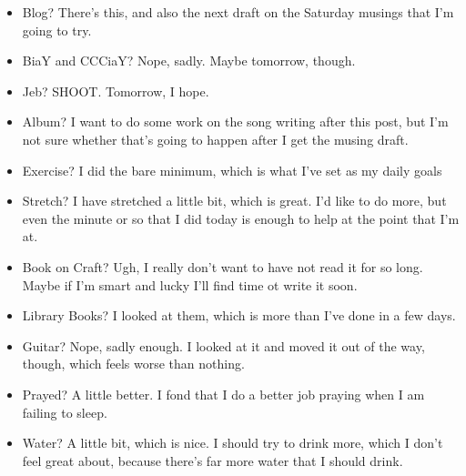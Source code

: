 \documentclass[12pt]{article}[titlepage]
\renewcommand{\,}{\textsuperscript{,}}
\begin{document}
\begin{itemize}
\item Blog? There's this, and also the next draft on the Saturday musings that I'm going to try.
\item BiaY and CCCiaY? Nope, sadly. Maybe tomorrow, though.
\item Jeb? SHOOT. Tomorrow, I hope.
\item Album? I want to do some work on the song writing after this post, but I'm not sure whether that's going to happen after I get the musing draft.
\item Exercise? I did the bare minimum, which is what I've set as my daily goals
\item Stretch? I have stretched a little bit, which is great. I'd like to do more, but even the minute or so that I did today is enough to help at the point that I'm at.
\item Book on Craft? Ugh, I really don't want to have not read it for so long. Maybe if I'm smart and lucky I'll find time ot write it soon.
\item Library Books? I looked at them, which is more than I've done in a few days.
\item Guitar? Nope, sadly enough. I looked at it and moved it out of the way, though, which feels worse than nothing.
\item Prayed? A little better. I fond that I do a better job praying when I am failing to sleep.
\item Water? A little bit, which is nice. I should try to drink more, which I don't feel great about, because there's far more water that I should drink.
\end{itemize}
\end{document}
